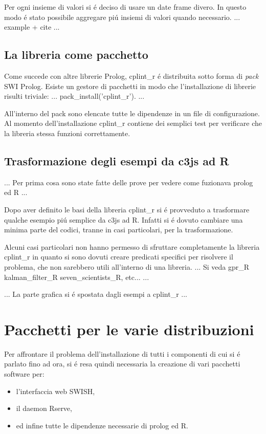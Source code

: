 \documentclass[10pt,titlepage,twoside,a4paper]{report}
\begin{document}
Per ogni insieme di valori si \'e deciso di usare un date frame divero. In 
questo modo \'e stato possibile aggregare pi\'u insiemi di valori quando 
necessario. ... example + cite ...

\section{La libreria come pacchetto}
Come succede con altre librerie Prolog, cplint\_r \'e distribuita sotto forma 
di \emph{pack} SWI Prolog. Esiste un gestore di pacchetti in modo che 
l'installazione di librerie risulti triviale: ... pack\_install('cplint\_r'). 
...

All'interno del pack sono elencate tutte le dipendenze in un file di 
configurazione. Al momento dell'installazione cplint\_r contiene dei semplici 
test per verificare che la libreria stessa funzioni correttamente.

\section{Trasformazione degli esempi da c3js ad R} \label{sec:trasformazione-
degli-esempi-da-c3js-ad-r}
... Per prima cosa sono state fatte delle prove per vedere come fuzionava 
prolog ed R ...

Dopo aver definito le basi della libreria cplint\_r si \'e provveduto a 
trasformare qualche esempio pi\'u semplice da c3js ad R. Infatti si \'e 
dovuto cambiare una minima parte del codici, tranne in casi particolari, per la 
trasformazione.

Alcuni casi particolari non hanno permesso di sfruttare completamente la 
libreria cplint\_r in quanto si sono dovuti creare predicati specifici per 
risolvere il problema, che non sarebbero utili all'interno di una libreria. 
... Si veda gpr\_R kalman\_filter\_R seven\_scientists\_R, etc... ...


... La parte grafica si \'e spostata dagli esempi a cplint\_r ...




\chapter{Pacchetti per le varie distribuzioni} 
\label{ch:pacchetti-per-le-varie-distribuzioni}
Per affrontare il problema dell'installazione di tutti i componenti di cui si 
\'e parlato fino ad ora, si \'e resa quindi necessaria la creazione di vari 
pacchetti software per:
\begin{itemize}
    \item l'interfaccia web SWISH,
    \item il daemon Rserve,
    \item ed infine tutte le dipendenze necessarie di prolog ed R.
\end{itemize}
\end{document}
